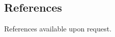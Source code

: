 \documentclass[margin,line,10pt]{res}
\begin{document}
\begin{resume}
\section{\sc References}
References available upon request. 

\end{resume}
\end{document}
